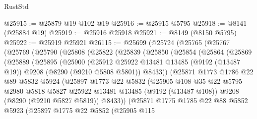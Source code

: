 \begin{lexlean}{RustStd}
\begin{coremodule}
@25915 := @25879 @19 @102 @19
@25916 := @25915 @5795
@25918 := @8141 (@25884 @19)
@25919 := @25916 @25918
@25921 := @8149 (@8150 @5795)
@25922 := @25919 @25921
@26115 := @25699
    (@25724
      (@25765
        (@25767
          (@25769
            (@25790
              (@25808
                (@25822
                  (@25839
                    (@25850
                      (@25854
                        (@25864
                          (@25869
                            (@25889
                              (@25895
                                (@25900
                                  (@25912
                                    @25922
                                    @13481
                                    @13485
                                    (@9192 (@13487 @19))
                                    @9208
                                    (@8290 (@9210 @5808 @5801))
                                    @8433))
                                (@25871
                                  @1773
                                  @1786
                                  @22
                                  @89
                                  @5832
                                  @5924
                                  (@25897
                                    @1773
                                    @22
                                    @5832
                                    (@25905
                                      @108
                                      @35
                                      @22
                                      @5795
                                      @2980
                                      @5818
                                      @5827
                                      @25922
                                      @13481
                                      @13485
                                      (@9192 (@13487 @108))
                                      @9208
                                      (@8290 (@9210 @5827 @5819))
                                      @8433))
                                  (@25871
                                    @1775
                                    @1785
                                    @22
                                    @88
                                    @5852
                                    @5923
                                    (@25897
                                      @1775
                                      @22
                                      @5852
                                      (@25905
                                        @115

\end{coremodule}
\end{lexlean}
